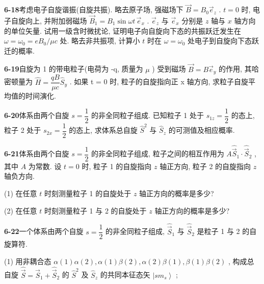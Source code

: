 \textbf{6-18}\quad 考虑电子自旋谐振(自旋共振). 略去原子场, 强磁场下 $\displaystyle \vec{B} = B_{0}\vec{e}_z$ . $\displaystyle t = 0$ 时, 电子自旋向上, 并附加弱磁场 $\displaystyle \vec{B}_{1} = B_{1}\sin \omega t\,\vec{e}_x$ . $\displaystyle \vec{e}_z$ 与 $\displaystyle \vec{e}_x$ 分别是 $\displaystyle z$ 轴与 $\displaystyle x$ 轴方向的单位矢量. 试用一级含时微扰论, 证明电子向自旋向下态的共振跃迁发生在 $\displaystyle \omega = \omega_{0} = eB_{0} / \mu c$ 处. 略去非共振项, 计算小 $\displaystyle t$ 时在 $\displaystyle \omega = \omega_{0}$ 处电子到自旋向下态跃迁的概率.

\vfill

\newpage

\textbf{6-19}\quad 自旋为 1 的带电粒子(电荷为 -q, 质量为 $\displaystyle \mu$ ) 受到磁场 $\displaystyle \vec{B} = B\vec{e}_y$ 的作用, 其哈密顿量为 $\displaystyle \hat{H} = \dfrac{qB}{\mu c} \hat{S}_{y}$ . 如果 t = 0 时, 粒子的自旋指向正 x 轴方向, 求粒子自旋平均值的时间演化.

\vfill

\newpage

\textbf{6-20}\quad 体系由两个自旋 $\displaystyle s = \dfrac{1}{2}$ 的非全同粒子组成. 已知粒子 1 处于 $\displaystyle s_{1z} = \dfrac{1}{2}$ 的态上, 粒子 2 处于 $\displaystyle s_{2x} = \dfrac{1}{2}$ 的态上, 求体系总自旋 $\displaystyle \hat{S}^2$ 与 $\displaystyle \hat{S}_z$ 的可测值及相应概率.

\vfill

\newpage

\textbf{6-21}\quad 体系由两个自旋 $\displaystyle s = \dfrac{1}{2}$ 的非全同粒子组成, 粒子之间的相互作用为 $\displaystyle A\hat{\vec{S}}_1 \cdot \hat{\vec{S}}_2$ , 其中 $\displaystyle A$ 为常数. 设 $\displaystyle t = 0$ 时, 粒子 1 的自旋指向 $\displaystyle z$ 轴正方向, 粒子 2 的自旋指向 $\displaystyle z$ 轴负方向.

(1) 在任意 $\displaystyle t$ 时刻测量粒子 1 的自旋处于 $\displaystyle z$ 轴正方向的概率是多少?

(2) 在任意 $\displaystyle t$ 时刻测量粒子 1 与 2 的自旋处于 $\displaystyle z$ 轴正方向的概率是多少?

\vfill

\newpage

\textbf{6-22}\quad 一个体系由两个自旋 $\displaystyle s = \dfrac{1}{2}$ 的非全同粒子组成, $\displaystyle \hat{\vec{S}}_1$ 与 $\displaystyle \hat{\vec{S}}_2$ 是粒子 1 与 2 的自旋算符.

(1) 用非耦合态 $\displaystyle \alpha(1)\alpha(2),\alpha(1)\beta(2),\alpha(2)\beta(1),\beta(1)\beta(2)$ , 构成总自旋 $\displaystyle \hat{\vec{S}} = \hat{\vec{S}}_1 + \hat{\vec{S}}_2$ 的 $\displaystyle \hat{S}^2$ 及 $\displaystyle \hat{S}_z$ 的共同本征态矢 $\displaystyle \left|sm_s\right\rangle$ ;

